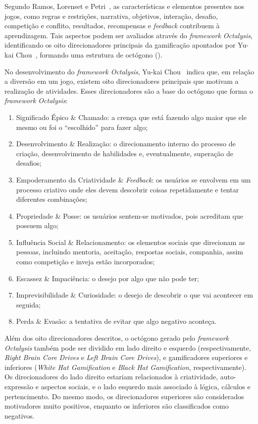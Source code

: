 Segundo Ramos, Lorenset e Petri~\cite{ramos_jogos_2016}, as características e elementos presentes nos jogos, como  regras e restrições, narrativa, objetivos, interação, desafio, competição e conflito, resultados, recompensas e \textit{feedback} contribuem à aprendizagem. Tais aspectos podem ser avaliados através do \textit{framework Octalysis}, identificando os oito direcionadores principais da gamificação apontados por Yu-kai Chou~\cite{chou_octalysis_2015}, formando uma estrutura de octógono ().


No desenvolvimento do \textit{framework Octalysis}, Yu-kai Chou~\cite{chou_octalysis_2015} indica que, em relação a diversão em um jogo, existem oito direcionadores principais que motivam a realização de atividades. Esses direcionadores são a base do octógono que forma o  \textit{framework Octalysis}:

\begin{enumerate}
\item Significado Épico \& Chamado: a crença que está fazendo algo maior que ele mesmo ou foi o “escolhido” para fazer algo;
\item Desenvolvimento \& Realização: o direcionamento interno do processo de criação, desenvolvimento de habilidades e, eventualmente, superação de desafios;
\item Empoderamento da Criatividade \& \textit{Feedback}: os usuários se envolvem em um processo criativo onde eles devem descobrir coisas repetidamente e tentar diferentes combinações;
\item Propriedade \& Posse: os usuários sentem-se motivados, pois acreditam que possuem algo;
\item Influência Social \& Relacionamento: os elementos sociais que direcionam as pessoas, incluindo mentoria, aceitação, respostas sociais, companhia, assim como competição e inveja estão incorporados;
\item Escassez \& Impaciência: o desejo por algo que não pode ter;
\item Imprevisibilidade \& Curiosidade: o desejo de descobrir o que vai acontecer em seguida;
\item Perda \& Evasão: a tentativa de evitar que algo negativo aconteça.
\end{enumerate}

Além dos oito direcionadores descritos, o octógono gerado pelo \textit{framework Octalysis} também pode ser dividido em lado direito e esquerdo (respectivamente, \textit{Right Brain Core Drives} e \textit{Left Brain Core Drives}), e gamificadores superiores e inferiores (\textit{White Hat Gamification} e \textit{Black Hat Gamification}, respectivamente).  Os direcionadores do lado direito estariam relacionados à criatividade, auto-expressão e aspectos sociais, e o lado esquerdo mais associado à lógica, cálculos e pertencimento. Do mesmo modo, os direcionadores superiores são considerados motivadores muito positivos, enquanto os inferiores são classificados como negativos.

